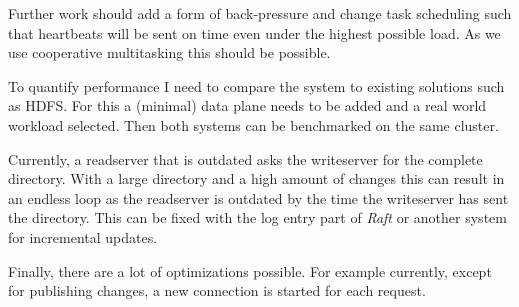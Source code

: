 Further work should add a form of back-pressure and change task scheduling such that heartbeats will be sent on time even under the highest possible load. As we use cooperative multitasking this should be possible.

To quantify performance I need to compare the system to existing solutions such as HDFS. For this a (minimal) data plane needs to be added and a real world workload selected. Then both systems can be benchmarked on the same cluster.

Currently, a readserver that is outdated asks the writeserver for the complete directory. With a large directory and a high amount of changes this can result in an endless loop as the readserver is outdated by the time the writeserver has sent the directory. This can be fixed with the log entry part of \textit{Raft} or another system for incremental updates.

Finally, there are a lot of optimizations possible. For example currently, except for publishing changes, a new connection is started for each request.
